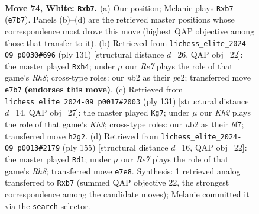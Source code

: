 \documentclass[11pt]{article}
\begin{document}
\clearpage

\begin{figure}[p]\centering
\begin{subfigure}{0.46\textwidth}\centering
\resizebox{\linewidth}{!}{%
\newchessgame
\chessboard[
  setfen={8/1p2R2p/6pP/2k2p2/p4P2/8/1n5K/8 w - - 4 74},
  showmover=false,
  pgfstyle=straightmove, color=movearrow, markmove={e7-b7}
]}
\caption{}
\end{subfigure}\hfill
\begin{subfigure}{0.46\textwidth}\centering
\resizebox{\linewidth}{!}{%
\newchessgame
\chessboard[
  setfen={8/1k6/8/p5R1/2P4P/1P4p1/1K2P3/7r b - - 2 66},
  showmover=false,
  pgfstyle=straightmove, color=movearrow, markmove={h1-h4}
]}
\caption{}
\end{subfigure}
\\[4pt]
\begin{subfigure}{0.46\textwidth}\centering
\resizebox{\linewidth}{!}{%
\newchessgame
\chessboard[
  setfen={8/5B2/5p1k/p7/P3P2P/1P1r2P1/5K2/8 b - - 22 66},
  showmover=false,
  pgfstyle=straightmove, color=movearrow, markmove={h6-g7}
]}
\caption{}
\end{subfigure}\hfill
\begin{subfigure}{0.46\textwidth}\centering
\resizebox{\linewidth}{!}{%
\newchessgame
\chessboard[
  setfen={8/8/4k1p1/6P1/1P5P/P2N1PK1/8/7r b - - 18 78},
  showmover=false,
  pgfstyle=straightmove, color=movearrow, markmove={h1-d1}
]}
\caption{}
\end{subfigure}
\caption{\textbf{Move 74, White: \texttt{Rxb7}.} (a) Our position; Melanie plays \texttt{Rxb7} (\texttt{e7b7}). Panels (b)--(d) are the retrieved master positions whose correspondence most drove this move (highest QAP objective among those that transfer to it). (b) Retrieved from \texttt{lichess\_elite\_2024-09\_p0030\#696} (ply 131) [structural distance $d$=26, QAP obj=22]: the master played \texttt{Rxh4}; under $\mu$ our \emph{Re7} plays the role of that game's \emph{Rh8}; cross-type roles: our \emph{n}b2 as their \emph{p}e2; transferred move \texttt{e7b7} \textbf{(endorses this move)}. (c) Retrieved from \texttt{lichess\_elite\_2024-09\_p0017\#2003} (ply 131) [structural distance $d$=14, QAP obj=27]: the master played \texttt{Kg7}; under $\mu$ our \emph{Kh2} plays the role of that game's \emph{Kh3}; cross-type roles: our \emph{n}b2 as their \emph{b}f7; transferred move \texttt{h2g2}. (d) Retrieved from \texttt{lichess\_elite\_2024-09\_p0013\#2179} (ply 155) [structural distance $d$=16, QAP obj=22]: the master played \texttt{Rd1}; under $\mu$ our \emph{Re7} plays the role of that game's \emph{Rh8}; transferred move \texttt{e7e8}. Synthesis: 1 retrieved analog transferred to \texttt{Rxb7} (summed QAP objective 22, the strongest correspondence among the candidate moves); Melanie committed it via the \texttt{search} selector.}
\label{fig:thought-m146}
\end{figure}
\end{document}
